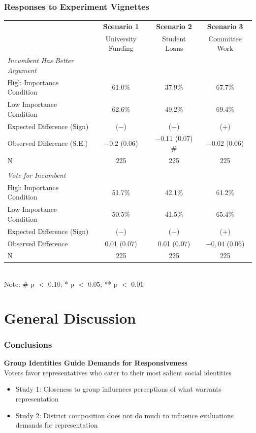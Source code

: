 \documentclass[14pt]{beamer}
\newcommand\e{\emph}
\newcommand\tb{\textbf}
\begin{document}
\begin{frame}
\frametitle{Responses to Experiment Vignettes}
\scriptsize
\begin{table}
	\centering
	\begin{tabulary}{\linewidth}{Lccc}
	\\
	\hline
	&\tb{Scenario 1}&\tb{Scenario 2}&\tb{Scenario 3}\\
	&University Funding& Student Loans&Committee Work\\
	\hline
	\e{Incumbent Has Better Argument}&&&\\
	High Importance Condition&61.0\%&37.9\%&67.7\% \\
	Low Importance Condition&62.6\%&49.2\%&69.4\%\\
	Expected Difference (Sign)& ($-$)&($-$)&($+$)\\
	Observed Difference (S.E.)&$-0.2$ (0.06)&$-0.11$ (0.07) \# &$-0.02$ (0.06)\\
	N&225&225&225\\
	&&&\\
	\e{Vote for Incumbent}&&&\\
	High Importance Condition&51.7\%&42.1\%&61.2\%\\
	Low Importance Condition&50.5\%&41.5\%&65.4\%\\
	Expected Difference (Sign)& ($-$)&($-$)&($+$)\\
	Observed Difference&0.01 (0.07)&0.01 (0.07)&$-0,04$ (0.06)\\
	N&225&225&225\\
	\hline
	\end{tabulary}\\
Note: \# p $<$ 0.10; * p $<$ 0.05; ** p $<$ 0.01
\end{table}
\end{frame}

\section{General Discussion}
\begin{frame}
\frametitle{Conclusions}
\begin{center}
	\large
	\tb{Group Identities Guide Demands for Responsiveness} \\
	\smallskip
	\normalsize 
	Voters favor representatives who cater to their most salient social identities
\end{center}
\begin{itemize}
	\small
	\item Study 1: Closeness to group influences perceptions of what warrants representation 
	\item Study 2: District composition does not do much to influence evaluations demands for representation
\end{itemize}
\end{frame}
\end{document}
